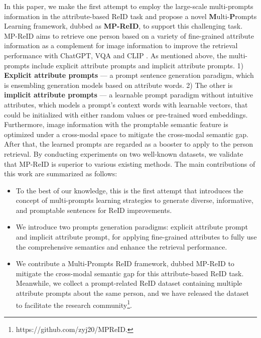 \documentclass[letterpaper]{article} %
\begin{document}
In this paper, we make the first attempt to employ the large-scale multi-prompts information in the attribute-based ReID task and propose a novel \textbf{M}ulti-\textbf{P}rompts Learning framework, dubbed as \textbf{MP-ReID}, to support this challenging task. MP-ReID aims to retrieve one person based on a variety of fine-grained attribute information as a complement for image information to improve the retrieval performance with ChatGPT, VQA and CLIP \cite{radford2021learning}. As mentioned above, the multi-prompts include explicit attribute prompts and implicit attribute prompts. 1) \textbf{Explicit attribute prompts} --- a prompt sentence generation paradigm, which is ensembling generation models based on attribute words. 2) The other is \textbf{implicit attribute prompts} --- a learnable prompt paradigm without intuitive attributes, which models a prompt’s context words with learnable vectors, that could be initialized with either random values or pre-trained word embeddings. Furthermore, image information with the promptable semantic feature is optimized under a cross-modal space to mitigate the cross-modal semantic gap. After that, the learned prompts are regarded as a booster to apply to the person retrieval. By conducting experiments on two well-known datasets, we validate that MP-ReID is superior to various existing methods. The main contributions of this work are summarized as follows:
\begin{itemize}[leftmargin=*]
\item{To the best of our knowledge, this is the first attempt that introduces the concept of multi-prompts learning strategies to generate diverse, informative, and promptable sentences for ReID improvements.}
\item{We introduce two prompts generation paradigms: explicit attribute prompt and implicit attribute prompt, for applying fine-grained attributes to fully use the comprehensive semantics and enhance the retrieval performance.}
\item{We contribute a Multi-Prompts ReID framework, dubbed MP-ReID to mitigate the cross-modal semantic gap for this attribute-based ReID task. Meanwhile, we collect a prompt-related ReID dataset containing multiple attribute prompts about the same person, and we have released the dataset to facilitate the research community\footnote{https://github.com/zyj20/MPReID.}.}
\end{itemize}
\end{document}
